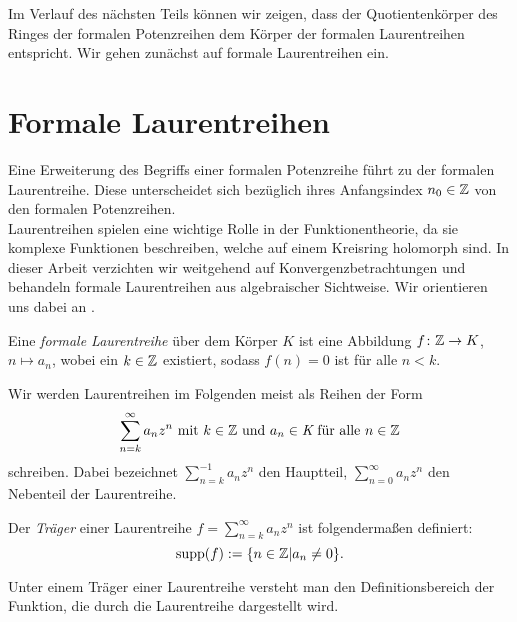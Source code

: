 %
%
%
%
%
%
%
%
%
%
%
%
%
Im Verlauf des nächsten Teils können wir zeigen, dass der Quotientenkörper des Ringes der formalen Potenzreihen dem Körper der formalen Laurentreihen entspricht. Wir gehen zunächst auf formale Laurentreihen ein.
%
%
%
%
\section{Formale Laurentreihen}
%
Eine Erweiterung des Begriffs einer formalen Potenzreihe führt zu der formalen Laurentreihe. Diese unterscheidet sich bezüglich ihres Anfangsindex $n_0 \in \mathbb{Z}$ von den formalen Potenzreihen. \\
Laurentreihen spielen eine wichtige Rolle in der Funktionentheorie, da sie komplexe Funktionen beschreiben, welche auf einem Kreisring holomorph sind. In dieser Arbeit verzichten wir weitgehend auf Konvergenzbetrachtungen und behandeln formale Laurentreihen aus algebraischer Sichtweise. %
Wir orientieren uns dabei an \cite[S. 563 - 572]{Lueneburg08}.
%
\begin{defn}
Eine \textit{formale Laurentreihe} über dem Körper $K$ ist eine Abbildung $f \colon \mathbb{Z} \rightarrow K$, $n \mapsto a_n$, wobei ein $k\in \mathbb{Z}$ existiert, sodass $f(n) = 0$ ist für alle $n < k$.
\end{defn}
%
%
\begin{nota}
Wir werden Laurentreihen im Folgenden meist als Reihen der Form
\begin{equation*}
\sum_{n= k}^{\infty}a_nz^n \text{ mit } k \in \mathbb{Z} \text{ und }a_n \in\textit{K}\text{ für alle } n\in\mathbb{Z} 
\end{equation*} 
schreiben.
Dabei bezeichnet $\sum_{n=k}^{-1}a_{n}z^{n}$ den Hauptteil, $\sum_{n=0}^{\infty}a_nz^n$ den Nebenteil der Laurentreihe. 
\end{nota}
%
%
%
%
%
%
%
%
%
%
% 
\begin{defn}\label{traeger}
Der \textit{Träger} einer Laurentreihe $f = \sum_{n =k}^{\infty} a_nz^n$ ist folgendermaßen definiert: 
\[\text{supp}(f) := \lbrace n \in \mathbb{Z} | a_n \neq 0 \rbrace.\] 
\end{defn}
%
%
%
%
\newpage
\begin{bem}
Unter einem Träger einer Laurentreihe versteht man den Definitionsbereich der Funktion, die durch die Laurentreihe dargestellt wird.
\end{bem}
%
%
%
%
